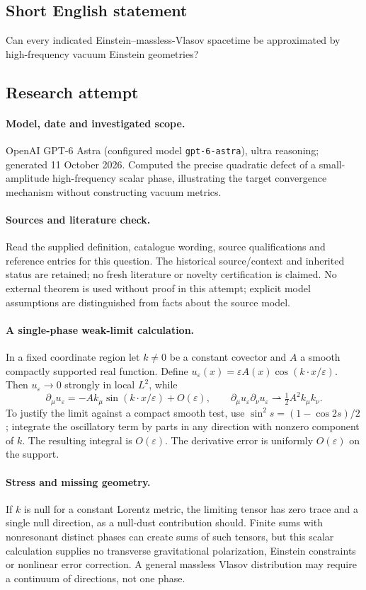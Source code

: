 \documentclass[11pt]{article}
\begin{document}
\subsection{Short English statement}
Can every indicated Einstein--massless-Vlasov spacetime be approximated by high-frequency vacuum Einstein geometries?
\subsection{Research attempt}
\paragraph{Model, date and investigated scope.}
OpenAI GPT-6 Astra (configured model \texttt{gpt-6-astra}), ultra reasoning; generated 11 October 2026. Computed the precise quadratic defect of a small-amplitude high-frequency scalar phase, illustrating the target convergence mechanism without constructing vacuum metrics.

\paragraph{Sources and literature check.}
Read the supplied definition, catalogue wording, source qualifications and reference entries for this question. The historical source/context and inherited status are retained; no fresh literature or novelty certification is claimed. No external theorem is used without proof in this attempt; explicit model assumptions are distinguished from facts about the source model.

\paragraph{A single-phase weak-limit calculation.} In a fixed coordinate region let \(k\ne0\) be a constant covector and \(A\) a smooth compactly supported real function. Define \(u_\varepsilon(x)=\varepsilon A(x)\cos(k\cdot x/\varepsilon)\). Then \(u_\varepsilon\to0\) strongly in local \(L^2\), while
\[
 \partial_\mu u_\varepsilon=-A k_\mu\sin(k\cdot x/\varepsilon)+O(\varepsilon),\qquad
 \partial_\mu u_\varepsilon\partial_\nu u_\varepsilon\rightharpoonup\tfrac12 A^2k_\mu k_\nu.
\]
To justify the limit against a compact smooth test, use \(\sin^2s=(1-\cos2s)/2\); integrate the oscillatory term by parts in any direction with nonzero component of \(k\). The resulting integral is \(O(\varepsilon)\). The derivative error is uniformly \(O(\varepsilon)\) on the support.
\paragraph{Stress and missing geometry.} If \(k\) is null for a constant Lorentz metric, the limiting tensor has zero trace and a single null direction, as a null-dust contribution should. Finite sums with nonresonant distinct phases can create sums of such tensors, but this scalar calculation supplies no transverse gravitational polarization, Einstein constraints or nonlinear error correction. A general massless Vlasov distribution may require a continuum of directions, not one phase.
\end{document}
